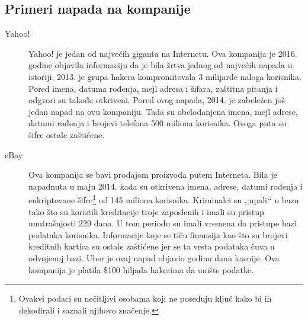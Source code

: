 \documentclass[a4paper]{article}
\theoremstyle{break}
\begin{document}
{\begin{description}
\end{description}


\subsection{Primeri napada na kompanije}
\label{subsec:primeri_napada_kompanije}


\begin{description}
\item [Yahoo!] Yahoo! je jedan od najvećih giganta na Internetu. Ova kompanija je 2016. godine objavila informaciju da je bila žrtva jednog od najvećih napada u istoriji; 2013. je grupa hakera kompromitovala 3 milijarde naloga korisnika. Pored imena, datuma rođenja, mejl adresa i šifara, zaštitna pitanja i odgvori su takođe otkriveni. 
Pored ovog napada, 2014. je zabeležen još jedan napad na ovu kompaniju. Tada su obelodanjena imena, mejl adrese, datumi rođenja i brojevi telefona 500 miliona korisnika. Ovoga puta su šifre ostale zaštićene. 
\item [eBay] Ova kompanija se bavi prodajom proizvoda putem Interneta. Bila je napadnuta u maju 2014. kada su otkrivena imena, adrese, datumi rođenja i enkriptovane šifre\footnote{Ovakvi podaci su nečitljivi osobama koji ne poseduju ključ kako bi ih dekodirali i saznali njihovo značenje.} od 145 miliona korisnika. Kriminalci su ,,upali‘‘ u bazu tako što su koristili kreditacije troje zaposlenih i imali su pristup unutrašnjosti 229 dana. U tom periodu su imali vremena da pristupe bazi podataka korisnika. Informacije koje se tiču finansija kao što su brojevi kreditnih kartica su ostale zaštićene jer se ta vrsta podataka čuva u odvojenoj bazi.
Uber je ovaj napad objavio godinu dana kasnije. Ova kompanija je platila \$100 hiljada hakerima da unište podatke.  
\end{description}


}
\end{document}
